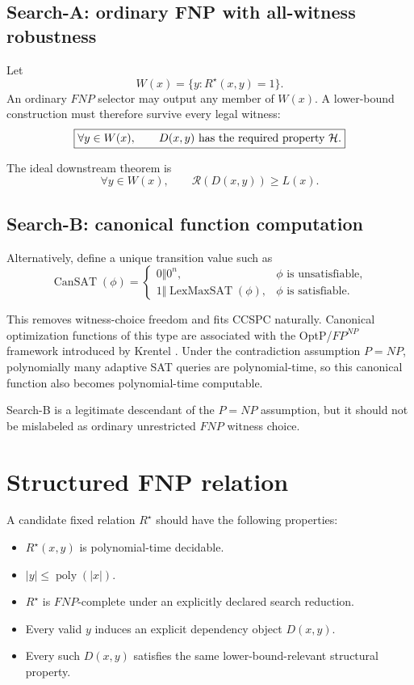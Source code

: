 \documentclass[11pt]{article}
\newcommand{\CanSAT}{\operatorname{CanSAT}}
\begin{document}
\subsection{Search-A: ordinary FNP with all-witness robustness}

Let
\[
W(x)=\{y:R^\star(x,y)=1\}.
\]
An ordinary \(FNP\) selector may output any member of \(W(x)\). A lower-bound construction must
therefore survive every legal witness:
\[
\boxed{
\forall y\in W(x),\qquad D(x,y)\text{ has the required property }{\cal H}.
}
\]

The ideal downstream theorem is
\[
\forall y\in W(x),
\qquad
\mathcal R(D(x,y))\ge L(x).
\]

\subsection{Search-B: canonical function computation}

Alternatively, define a unique transition value such as
\[
\CanSAT(\phi)
=
\begin{cases}
0\Vert 0^n,&\phi\text{ is unsatisfiable},\\
1\Vert \operatorname{LexMaxSAT}(\phi),&\phi\text{ is satisfiable}.
\end{cases}
\]

This removes witness-choice freedom and fits CCSPC naturally. Canonical optimization functions of
this type are associated with the OptP/\(FP^{NP}\) framework introduced by Krentel
\cite{Krentel1988}. Under the contradiction assumption \(P=NP\), polynomially many adaptive SAT
queries are polynomial-time, so this canonical function also becomes polynomial-time computable.

Search-B is a legitimate descendant of the \(P=NP\) assumption, but it should not be mislabeled as
ordinary unrestricted \(FNP\) witness choice.

\section{Structured FNP relation}

A candidate fixed relation \(R^\star\) should have the following properties:
\begin{itemize}
\item[] \(R^\star(x,y)\) is polynomial-time decidable.
\item[] \(|y|\le\operatorname{poly}(|x|)\).
\item[] \(R^\star\) is \(FNP\)-complete under an explicitly declared search reduction.
\item[] Every valid \(y\) induces an explicit dependency object \(D(x,y)\).
\item[] Every such \(D(x,y)\) satisfies the same lower-bound-relevant structural property.
\end{itemize}
\end{document}
